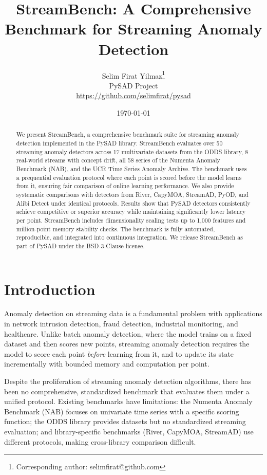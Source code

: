 \documentclass[11pt,a4paper]{article}
\title{StreamBench: A Comprehensive Benchmark for Streaming Anomaly Detection}
\author{
    Selim Firat Yilmaz\thanks{Corresponding author: selimfirat@github.com} \\
    PySAD Project \\
    \url{https://github.com/selimfirat/pysad}
}
\date{\today}
\begin{document}
\maketitle

\begin{abstract}
We present StreamBench, a comprehensive benchmark suite for streaming anomaly detection implemented in the PySAD library. StreamBench evaluates over 50 streaming anomaly detectors across 17 multivariate datasets from the ODDS library, 8 real-world streams with concept drift, all 58 series of the Numenta Anomaly Benchmark (NAB), and the UCR Time Series Anomaly Archive. The benchmark uses a prequential evaluation protocol where each point is scored before the model learns from it, ensuring fair comparison of online learning performance. We also provide systematic comparisons with detectors from River, CapyMOA, StreamAD, PyOD, and Alibi Detect under identical protocols. Results show that PySAD detectors consistently achieve competitive or superior accuracy while maintaining significantly lower latency per point. StreamBench includes dimensionality scaling tests up to 1,000 features and million-point memory stability checks. The benchmark is fully automated, reproducible, and integrated into continuous integration. We release StreamBench as part of PySAD under the BSD-3-Clause license.
\end{abstract}


\section{Introduction}
\label{sec:introduction}

Anomaly detection on streaming data is a fundamental problem with applications in network intrusion detection, fraud detection, industrial monitoring, and healthcare. Unlike batch anomaly detection, where the model trains on a fixed dataset and then scores new points, streaming anomaly detection requires the model to score each point \textit{before} learning from it, and to update its state incrementally with bounded memory and computation per point.

Despite the proliferation of streaming anomaly detection algorithms, there has been no comprehensive, standardized benchmark that evaluates them under a unified protocol. Existing benchmarks have limitations: the Numenta Anomaly Benchmark (NAB) focuses on univariate time series with a specific scoring function; the ODDS library provides datasets but no standardized streaming evaluation; and library-specific benchmarks (River, CapyMOA, StreamAD) use different protocols, making cross-library comparison difficult.
\end{document}
